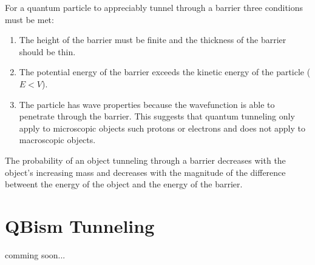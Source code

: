\documentclass[]{article}
\begin{document}
For a quantum particle to appreciably tunnel through a barrier three conditions must be met:
\begin{enumerate}
\item The height of the barrier must be finite and the thickness of the barrier should be thin.
\item The potential energy of the barrier exceeds the kinetic energy of the particle ($E<V$). 
\item The particle has wave properties because the wavefunction is able to penetrate through the barrier. This suggests that quantum tunneling only apply to microscopic objects such protons or electrons and does not apply to macroscopic objects.
\end{enumerate}

The probability of an object tunneling through a barrier decreases with the object's increasing mass and decreases with the magnitude of the difference betweent the energy of the object and the energy of the barrier.

\section*{QBism Tunneling}
comming soon...
\end{document}
